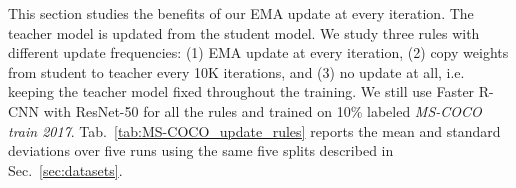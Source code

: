 \documentclass[final]{cvpr}
\begin{document}
This section studies the benefits of our EMA update at every iteration.   
The teacher model is updated from the student model. We study three rules with different update frequencies: 
(1) EMA update at every iteration, (2) copy weights from student to teacher every 10K iterations, and (3) no update at all, i.e. keeping the teacher model fixed throughout the training.
We still use Faster R-CNN with ResNet-50 for all the rules and trained on 10\% labeled \textit{MS-COCO train 2017}. Tab.~\ref{tab:MS-COCO_update_rules} reports the mean and standard deviations over five runs using the same five splits described in Sec.~\ref{sec:datasets}.

\begin{table}[b]\centering
  \caption{Comparison between different update rules on \textit{MS-COCO train 2017} with 10\% data labeled. The mean and standard deviation over five data splits are reported (the same five splits of \textit{MS-COCO train 2017} as in Sec.~\ref{sec:datasets}).}
  \label{tab:MS-COCO_update_rules}
\end{table}
\end{document}
